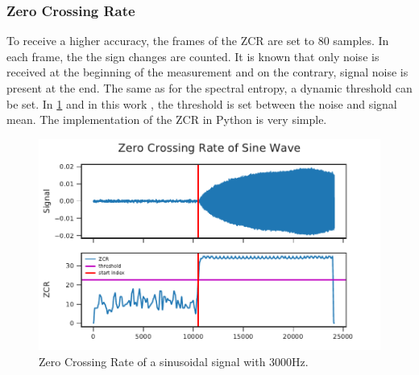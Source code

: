 
\subsubsection*{Zero Crossing Rate}

To receive a higher accuracy, the frames of the \ac{ZCR} are set to 80 samples.
In each frame, the the sign changes are counted.
It is known that only noise is received at the beginning of the measurement and on the
contrary, signal noise is present at the end.
The same as for the spectral entropy, a dynamic threshold can be set.
In \cref{fig:03_zcr} and in this work , the threshold is set between the
noise and signal mean.
The implementation of the \ac{ZCR} in Python is very simple.

\begin{figure}[ht]
	\centering
		\includegraphics[]{figures/sine_zcr}
	\caption{Zero Crossing Rate of a sinusoidal signal with 3000Hz.}
	\label{fig:03_zcr}
\end{figure}